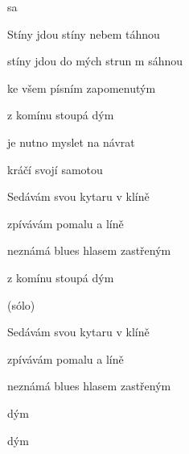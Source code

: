 

\zs
{}   

   

  sa 

  
\ks

\zs
Stíny jdou stíny nebem táhnou 

stíny jdou do mých strun m sáhnou 

ke všem písním zapomenutým 

z komínu stoupá dým 
\ks

\zr
{} 

je nutno myslet na návrat 

    


kráčí svojí samotou 

\kr

\zs
Sedávám svou kytaru v klíně 

zpívávám pomalu a líně 

neznámá blues hlasem zastřeným 

z komínu stoupá dým 
\ks

\zs
(sólo)
\ks

\zr
\kr

\zs
Sedávám svou kytaru v klíně 

zpívávám pomalu a líně 

neznámá blues hlasem zastřeným 

  dým ~  ~  ~ 
 
  dým ~  ~  ~ 
 
 ~ 
\ks

\kp
